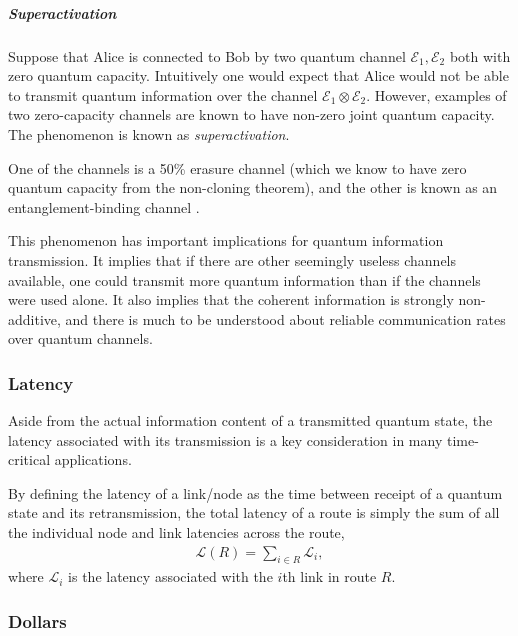 \subparagraph{Superactivation}

Suppose that Alice is connected to Bob by two quantum channel $\mathcal{E}_1,\mathcal{E}_2$ both with zero quantum capacity. Intuitively one would expect that Alice would not be able to transmit quantum information over the channel $\mathcal{E}_1\otimes \mathcal{E}_2$. However, examples of two zero-capacity channels are known to have non-zero joint quantum capacity. The phenomenon is known as \textit{superactivation}.

One of the channels is a 50\% erasure channel (which we know to have zero quantum capacity from the non-cloning theorem), and the other is known as an entanglement-binding channel \cite{bib:horodecki2001separability}.

This phenomenon has important implications for quantum information transmission. It implies that if there are other seemingly useless channels available, one could transmit more quantum information than if the channels were used alone. It also implies that the coherent information is strongly non-additive, and there is much to be understood about reliable communication rates over quantum channels.

%
%

\subsubsection{Latency} \label{sec:latency_metric} 

Aside from the actual information content of a transmitted quantum state, the latency associated with its transmission is a key consideration in many time-critical applications.

By defining the latency of a link/node as the time between receipt of a quantum state and its retransmission, the total latency of a route is simply the sum of all the individual node and link latencies across the route,
\begin{align}
\mathcal{L}(R) = \sum_{i\in R} \mathcal{L}_i,
\end{align}
where $\mathcal{L}_i$ is the latency associated with the $i$th link in route $R$.

%
%

\subsubsection{Dollars} \label{sec:dollars} 

